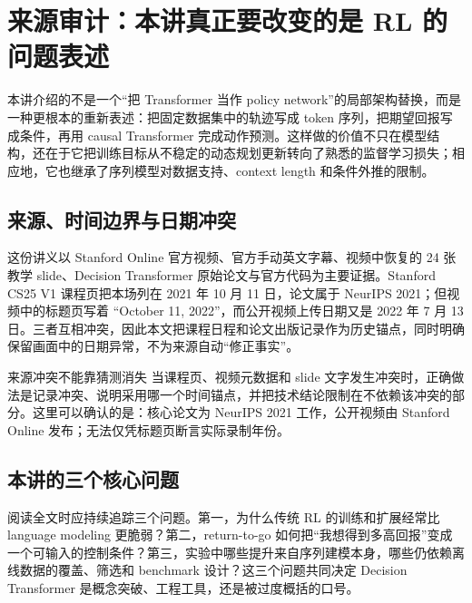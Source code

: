\section{来源审计：本讲真正要改变的是 RL 的问题表述}

本讲介绍的不是一个“把 Transformer 当作 policy network”的局部架构替换，而是一种更根本的重新表述：把固定数据集中的轨迹写成 token 序列，把期望回报写成条件，再用 causal Transformer 完成动作预测。这样做的价值不只在模型结构，还在于它把训练目标从不稳定的动态规划更新转向了熟悉的监督学习损失；相应地，它也继承了序列模型对数据支持、context length 和条件外推的限制。

\subsection{来源、时间边界与日期冲突}

这份讲义以 Stanford Online 官方视频、官方手动英文字幕、视频中恢复的 24 张教学 slide、Decision Transformer 原始论文与官方代码为主要证据。Stanford CS25 V1 课程页把本场列在 2021 年 10 月 11 日，论文属于 NeurIPS 2021；但视频中的标题页写着 ``October 11, 2022''，而公开视频上传日期又是 2022 年 7 月 13 日。三者互相冲突，因此本文把课程日程和论文出版记录作为历史锚点，同时明确保留画面中的日期异常，不为来源自动“修正事实”。


\begin{warningbox}{来源冲突不能靠猜测消失}
当课程页、视频元数据和 slide 文字发生冲突时，正确做法是记录冲突、说明采用哪一个时间锚点，并把技术结论限制在不依赖该冲突的部分。这里可以确认的是：核心论文为 NeurIPS 2021 工作，公开视频由 Stanford Online 发布；无法仅凭标题页断言实际录制年份。
\end{warningbox}

\subsection{本讲的三个核心问题}

阅读全文时应持续追踪三个问题。第一，为什么传统 RL 的训练和扩展经常比 language modeling 更脆弱？第二，return-to-go 如何把“我想得到多高回报”变成一个可输入的控制条件？第三，实验中哪些提升来自序列建模本身，哪些仍依赖离线数据的覆盖、筛选和 benchmark 设计？这三个问题共同决定 Decision Transformer 是概念突破、工程工具，还是被过度概括的口号。

